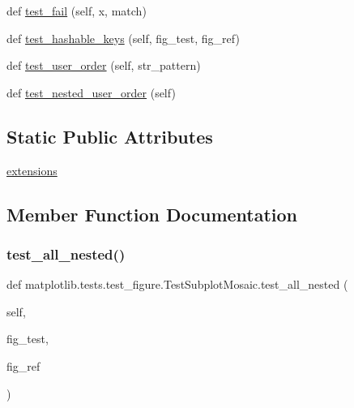 \begin{DoxyCompactItemize}
\item 
def \hyperlink{classmatplotlib_1_1tests_1_1test__figure_1_1TestSubplotMosaic_a80a0eaed3bf3facd14cd315962396fb9}{test\+\_\+fail} (self, x, match)
\item 
def \hyperlink{classmatplotlib_1_1tests_1_1test__figure_1_1TestSubplotMosaic_a7ca68442a69d435d6957a2bba101e1f4}{test\+\_\+hashable\+\_\+keys} (self, fig\+\_\+test, fig\+\_\+ref)
\item 
def \hyperlink{classmatplotlib_1_1tests_1_1test__figure_1_1TestSubplotMosaic_a77d1e98f9727ace7798cee3015da2a51}{test\+\_\+user\+\_\+order} (self, str\+\_\+pattern)
\item 
def \hyperlink{classmatplotlib_1_1tests_1_1test__figure_1_1TestSubplotMosaic_ae0849e81ff604e97328b0f01d09de134}{test\+\_\+nested\+\_\+user\+\_\+order} (self)
\end{DoxyCompactItemize}
\subsection*{Static Public Attributes}
\begin{DoxyCompactItemize}
\item 
\hyperlink{classmatplotlib_1_1tests_1_1test__figure_1_1TestSubplotMosaic_afa72bbd232647bc9bea99db536f25973}{extensions}
\end{DoxyCompactItemize}


\subsection{Member Function Documentation}
\mbox{\label{classmatplotlib_1_1tests_1_1test__figure_1_1TestSubplotMosaic_afc004c8a44b6e10c0e8f2554f64e852b}} 
\subsubsection{\texorpdfstring{test\+\_\+all\+\_\+nested()}{test\_all\_nested()}}
{\footnotesize\ttfamily def matplotlib.\+tests.\+test\+\_\+figure.\+Test\+Subplot\+Mosaic.\+test\+\_\+all\+\_\+nested (\begin{DoxyParamCaption}\item[{}]{self,  }\item[{}]{fig\+\_\+test,  }\item[{}]{fig\+\_\+ref }\end{DoxyParamCaption})}

